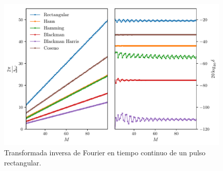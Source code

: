 \documentclass[a4paper]{report}
\begin{document}
\begin{figure}[!htb]
 \begin{center}
 \includegraphics[width=1\textwidth]{figuras/filter_design_windowing_windows_bandwidth_and_ripple.pdf}
 \caption{\label{fig:filter_design_windowing_windows_bandwidth_and_ripple} Transformada inversa de Fourier en tiempo continuo de un pulso rectangular.}
 \end{center}
\end{figure}
\end{document}
